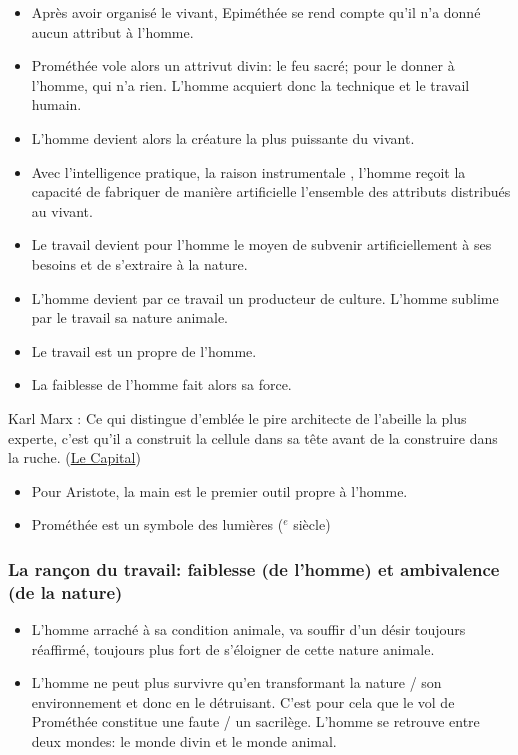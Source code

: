 \documentclass[a4paper, 11pt, hidelinks]{article}
\newcommand{\bs}{\bigskip}
\newcommand{\rb}[1]{\Romanbar{#1}}
\newcommand{\citer}[3]{\bs \begin{center} \textcolor{authorGray}{#1 :} \textcolor{citationRed}{\og #2 \fg} \textcolor{authorGray}{(\underline{#3})} \end{center} \bs}
\begin{document}
\begin{itemize}
    \item Après avoir organisé le vivant, Epiméthée se rend compte qu'il n'a donné aucun attribut à l'homme.
    \item Prométhée vole alors un attrivut divin: le feu sacré; pour le donner à l'homme, qui n'a rien.  L'homme acquiert
    donc la technique et le travail humain.
    \item  L'homme devient alors la créature la plus puissante du vivant.
    \item Avec l'intelligence pratique, la \og raison instrumentale \fg , l'homme reçoit la capacité de fabriquer de 
    manière artificielle l'ensemble des attributs distribués au vivant.
    \item Le travail devient pour l'homme le moyen de subvenir artificiellement à ses besoins et de s'extraire à la nature.
    \item L'homme devient par ce travail un producteur de culture. L'homme sublime par le travail sa nature animale.
    \item Le travail est un propre de l'homme.
    \item La faiblesse de l'homme fait alors sa force.
\end{itemize}


\citer{Karl Marx}{Ce qui distingue d'emblée le pire architecte de l'abeille la plus experte, c'est qu'il a construit la cellule dans sa tête avant de la construire dans la ruche.}{Le Capital}

\begin{itemize}
    \item Pour Aristote, la main est le premier outil propre à l'homme.
    \item Prométhée est un symbole des lumières (\rb{18}$^e$ siècle)
\end{itemize}

\subsubsection{La rançon du travail: faiblesse (de l'homme) et ambivalence (de la nature)}

\begin{itemize}
    \item L'homme \og arraché \fg à sa condition animale, va souffir d'un désir toujours réaffirmé, toujours plus fort de s'éloigner de cette nature animale.
    \item L'homme ne peut plus survivre qu'en transformant la nature / son environnement et donc en le détruisant. C'est pour cela que le vol de Prométhée 
    constitue une faute / un sacrilège. L'homme se retrouve entre deux mondes: le monde divin et le monde animal.
\end{itemize}
\end{document}
